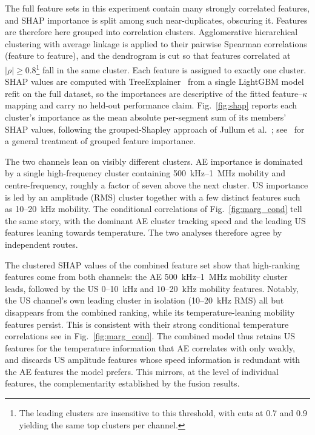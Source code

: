 The full feature sets in this experiment contain many strongly correlated features, and SHAP importance is split among such near-duplicates, obscuring it. Features are therefore here grouped into correlation clusters. Agglomerative hierarchical clustering with average linkage is applied to their pairwise Spearman correlations (feature to feature), and the dendrogram is cut so that features correlated at $|\rho| \geq 0.8$\footnote{The leading clusters are insensitive to this threshold, with cuts at 0.7 and 0.9 yielding the same top clusters per channel.} fall in the same cluster. Each feature is assigned to exactly one cluster. SHAP values are computed with TreeExplainer~\cite{lundberg_local_2020} from a single LightGBM model refit on the full dataset, so the importances are descriptive of the fitted feature--$\kappa$ mapping and carry no held-out performance claim. Fig.~\ref{fig:shap} reports each cluster's importance as the mean absolute per-segment sum of its members' SHAP values, following the grouped-Shapley approach of Jullum et al.~\cite{jullum_groupshapley_2021}; see~\cite{au_grouped_2022} for a general treatment of grouped feature importance.

The two channels lean on visibly different clusters. AE importance is dominated by a single high-frequency cluster containing 500~kHz--1~MHz mobility and centre-frequency, roughly a factor of seven above the next cluster. US importance is led by an amplitude (RMS) cluster together with a few distinct features such as 10--20~kHz mobility. The conditional correlations of Fig.~\ref{fig:marg_cond} tell the same story, with the dominant AE cluster tracking speed and the leading US features leaning towards temperature. The two analyses therefore agree by independent routes.

The clustered SHAP values of the combined feature set show that high-ranking features come from both channels: the AE 500~kHz--1~MHz mobility cluster leads, followed by the US 0--10~kHz and 10--20~kHz mobility features. Notably, the US channel's own leading cluster in isolation (10--20~kHz RMS) all but disappears from the combined ranking, while its temperature-leaning mobility features persist. This is consistent with their strong conditional temperature correlations see in Fig.~\ref{fig:marg_cond}. The combined model thus retains US features for the temperature information that AE correlates with only weakly, and discards US amplitude features whose speed information is redundant with the AE features the model prefers. This mirrors, at the level of individual features, the complementarity established by the fusion results.


